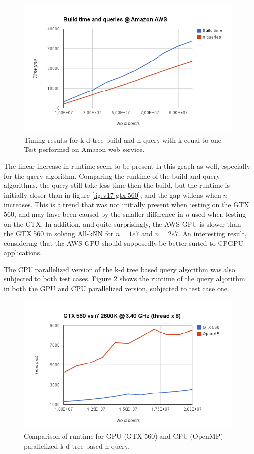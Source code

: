 \begin{figure}[ht!]
    \centering
    \includegraphics[width=120mm]{../gfx/v17-aws.png}
    \caption{Timing results for k-d tree build and n query with k equal to one. Test performed on Amazon web service.}
    \label{fig:v17-aws}
\end{figure}

The linear increase in runtime seem to be present in this graph as well, especially for the query algorithm. Comparing the runtime of the build and query algorithms, the query still take less time then the build, but the runtime is initially closer than in figure \ref{fig:v17-gtx-560}, and the gap widens when $n$ increases. This is a trend that was not initially present when testing on the GTX 560, and may have been caused by the smaller difference in $n$ used when testing on the GTX. In addition, and quite surprisingly, the AWS GPU is slower than the GTX 560 in solving All-kNN for $n=1e7$ and $n=2e7$. An interesting result, considering that the AWS GPU should supposedly be better suited to GPGPU applications.

The CPU parallelized version of the k-d tree based query algorithm was also subjected to both test cases. Figure \ref{fig:v17-gpu-vs-cpu} shows the runtime of the query algorithm in both the GPU and CPU parallelized version, subjected to test case one.

\begin{figure}[ht!]
    \centering
    \includegraphics[width=120mm]{../gfx/v17-gpu-vs-cpu.png}
    \caption{Comparison of runtime for GPU (GTX 560) and CPU (OpenMP) parallelized k-d tree based n query.}
    \label{fig:v17-gpu-vs-cpu}
\end{figure}

